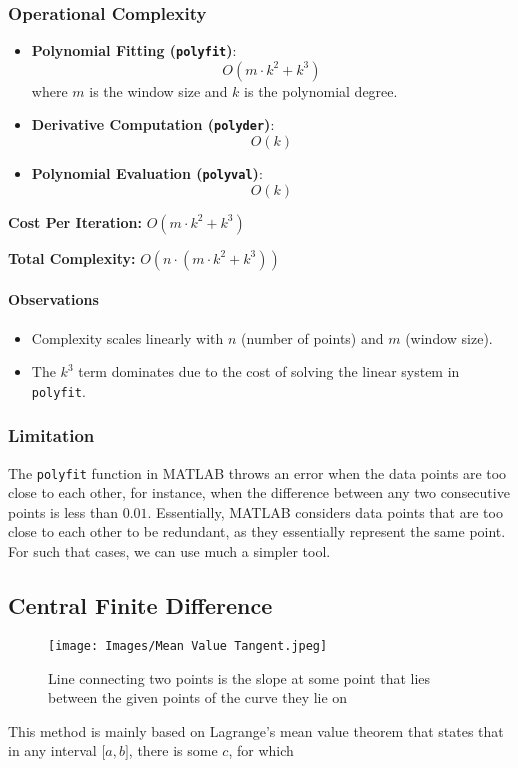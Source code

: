 \documentclass[a4paper]{article}
\begin{document}
\subsubsection*{Operational Complexity}
\begin{itemize}
    \item \textbf{Polynomial Fitting (\texttt{polyfit})}: 
    \[
    O(m \cdot k^2 + k^3)
    \]
    where \( m \) is the window size and \( k \) is the polynomial degree.
    \item \textbf{Derivative Computation (\texttt{polyder})}:
    \[
    O(k)
    \]
    \item \textbf{Polynomial Evaluation (\texttt{polyval})}:
    \[
    O(k)
    \]
\end{itemize}

\textbf{Cost Per Iteration:} \(O(m \cdot k^2 + k^3)\)

\textbf{Total Complexity:} \(O(n \cdot (m \cdot k^2 + k^3))\)

\paragraph*{Observations}
\begin{itemize}
    \item Complexity scales linearly with \( n \) (number of points) and \( m \) (window size).
    \item The \( k^3 \) term dominates due to the cost of solving the linear system in \texttt{polyfit}.
\end{itemize}

\subsubsection{Limitation}
The \verb|polyfit| function in MATLAB throws an error when the data points are too close to each other, for instance, when the difference between any two consecutive points is less than \(0.01\). Essentially, MATLAB considers data points that are too close to each other to be redundant, as they essentially represent the same point. For such that cases, we can use much a simpler tool.

\hypertarget{Central Finite Difference}{%
\subsection{Central Finite Difference}\label{lagranges-mean-value-theorem}}

\begin{figure}[h]
    \centering
    \texttt{[image: Images/Mean Value Tangent.jpeg]}
    \caption{Line connecting two points is the slope at some point that lies between the given points of the curve they lie on}
\end{figure}
This method is mainly based on Lagrange's mean value theorem that states that in any interval \(\lbrack a,b\rbrack\), there is some \(c\), for which
\end{document}
